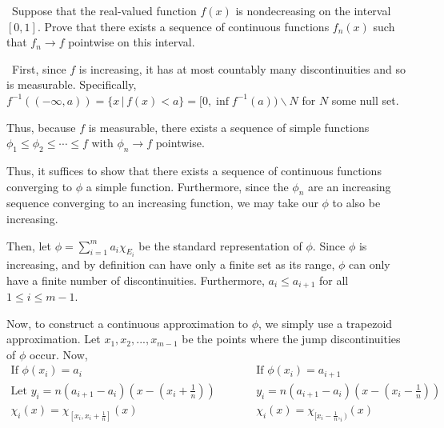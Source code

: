 \documentclass[12pt]{Homework}
\begin{document}
\begin{problem} $\,$
Suppose that the real-valued function $f(x)$ is nondecreasing on the interval $[0,1]$. Prove that there exists a sequence of continuous functions $f_n(x)$ such that $f_n\to f$ pointwise on this interval.
\end{problem}


\begin{solution}$\,$
First, since $f$ is increasing, it has at most countably many discontinuities and so is measurable. Specifically, $f^{-1}((-\infty,a))=\{x\,|\,f(x)<a\}=[0,\inf f^{-1}(a))\backslash N$ for $N$ some null set. 

Thus, because $f$ is measurable, there exists a sequence of simple functions $\phi_1\le\phi_2\le\cdots\le f$ with $\phi_n\to f$ pointwise. 

Thus, it suffices to show that there exists a sequence of continuous functions converging to $\phi$ a simple function. Furthermore, since the $\phi_n$ are an increasing sequence converging to an increasing function, we may take our $\phi$ to also be increasing.

Then, let $\phi=\sum_{i=1}^ma_i\chi_{E_i}$ be the standard representation of $\phi$. Since $\phi$ is increasing, and by definition can have only a finite set as its range, $\phi$ can only have a finite number of discontinuities. Furthermore, $a_i\le a_{i+1}$ for all $1\le i\le m-1$. 

Now, to construct a continuous approximation to $\phi$, we simply use a trapezoid approximation. Let $x_1,x_2,...,x_{m-1}$ be the points where the jump discontinuities of $\phi$ occur. Now,
\[
    \begin{matrix}
    \text{If } \phi(x_i)=a_i & \qquad & \text{If } \phi(x_i)=a_{i+1}\\
    \text{Let } y_i=n(a_{i+1}-a_i)(x-(x_i+\frac{1}{n})) & \qquad & y_i=n(a_{i+1}-a_i)(x-(x_i-\frac{1}{n}))\\
    \chi_i(x)=\chi_{[x_i,x_i+\frac{1}{n}]}(x) & \qquad & \chi_i(x)=\chi_{[x_i-\frac{1}{n},_i)}(x)
    \end{matrix}
\]

\begin{center}
\end{center}


\end{solution}
\end{document}

